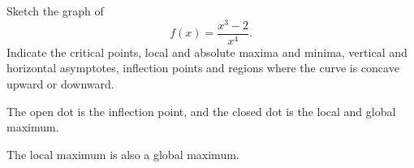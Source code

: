\begin{question}[1998H]\label{s3.6.6rationalfirst}
Sketch the graph of
\[ f(x)= \dfrac{x^3-2}{x^4}.\]
Indicate the critical points, local and absolute maxima and minima,
vertical and horizontal asymptotes, inflection points and regions where the
curve is concave upward or downward.
\end{question}
\begin{answer}
The open dot is the inflection point, and the closed dot is the local and global maximum.
\begin{center}
\end{center}
\end{answer}
\begin{hint}
The local maximum is also a global maximum.
\end{hint}

